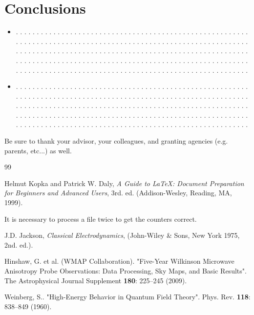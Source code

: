 \documentclass[twocolumn]{revtex4}
\begin{document}
\section{Conclusions}
\begin{itemize}

\item
. . . . . . . . . . . . . . . . . . . . . . . . . . . . . . . . . . . . . . . .
. . . . . . . . . . . . . . . . . . . . . . . . . . . . . . . . . . . . . . . .
. . . . . . . . . . . . . . . . . . . . . . . . . . . . . . . . . . . . . . . .
. . . . . . . . . . . . . . . . . . . . . . . . . . . . . . . . . . . . . . . .
. . . . . . . . . . . . . . . . . . . . . . . . . . . . . . . . . . . . . . . .
. . . . . . . . . . . . . . . . . . . . . . . . . . . . . . . . . . . . . . . .
. . . . . . . . . . . . . . . . . . . . . . . . . . . . . . . . . . . . . . . .

\item
. . . . . . . . . . . . . . . . . . . . . . . . . . . . . . . . . . . . . . . .
. . . . . . . . . . . . . . . . . . . . . . . . . . . . . . . . . . . . . . . .
. . . . . . . . . . . . . . . . . . . . . . . . . . . . . . . . . . . . . . . .
. . . . . . . . . . . . . . . . . . . . . . . . . . . . . . . . . . . . . . . .
. . . . . . . . . . . . . . . . . . . . . . . . . . . . . . . . . . . . . . . .
. . . . . . . . . . . . . . . . . . . . . . . . . . . . . . . . . . . . . . . .
. . . . . . . . . . . . . . . . . . . . . . . . . . . . . . . . . . . . . . . .
\end{itemize}



\vspace*{0.5cm}
\begin{acknowledgments}
Be sure to thank your advisor,
your colleagues, and granting agencies (e.g. parents, etc...) as well.
\end{acknowledgments}

\begin{thebibliography}{99}

Helmut Kopka and Patrick W. Daly, \textsl{A Guide to
\LaTeX: Document Preparation for Beginners and Advanced Users}, 3rd. ed. (Addison-Wesley, Reading, MA, 1999).

 It is necessary to process a file twice to
get the counters correct.

 J.D. Jackson, {\it Classical Electrodynamics}, (John-Wiley
\& Sons, New York 1975, 2nd. ed.).


 Hinshaw, G. et al. (WMAP Collaboration).
"Five-Year Wilkinson Microwave Anisotropy Probe Observations:
Data Processing, Sky Maps, and Basic Results".
The Astrophysical Journal Supplement {\bf 180}: 225–245 (2009).

 Weinberg, S.. "High-Energy Behavior in Quantum
Field Theory". Phys. Rev. {\bf 118}: 838–849 (1960).


\end{thebibliography}
\end{document}
